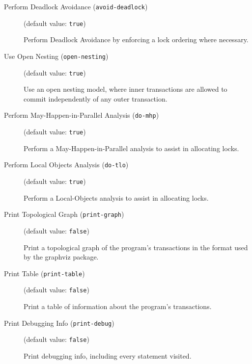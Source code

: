 \documentclass{article}
\begin{document}
\begin{description}
\begin{longtable}{p{1in}p{4in}}
\end{longtable}


\item[Perform Deadlock Avoidance ({\tt avoid-deadlock})]
(default value: {\tt true})




Perform Deadlock Avoidance by enforcing a lock ordering where necessary.



\item[Use Open Nesting ({\tt open-nesting})]
(default value: {\tt true})




Use an open nesting model, where inner transactions are allowed to commit
independently of any outer transaction.



\item[Perform May-Happen-in-Parallel Analysis ({\tt do-mhp})]
(default value: {\tt true})




Perform a May-Happen-in-Parallel analysis to assist in allocating locks.



\item[Perform Local Objects Analysis ({\tt do-tlo})]
(default value: {\tt true})




Perform a Local-Objects analysis to assist in allocating locks.



\item[Print Topological Graph ({\tt print-graph})]
(default value: {\tt false})




Print a topological graph of the program's transactions in the format used by the graphviz package.



\item[Print Table ({\tt print-table})]
(default value: {\tt false})




Print a table of information about the program's transactions.



\item[Print Debugging Info ({\tt print-debug})]
(default value: {\tt false})




Print debugging info, including every statement visited.



\end{description}
\end{document}
